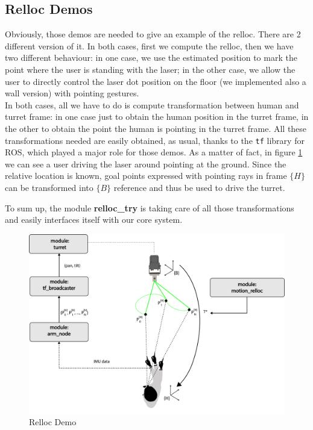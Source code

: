\subsection{Relloc Demos}
Obviously, those demos are needed to give an example of the relloc. There are 2 different version of it. In both cases, first we compute the relloc, then we have two different behaviour: in one case, we use the estimated position to mark the point where the user is standing with the laser; in the other case, we allow the user to directly control the laser dot position on the floor (we implemented also a wall version) with pointing gestures.\\
In both cases, all we have to do is compute transformation between human and turret frame: in one case just to obtain the human position in the turret frame, in the other to obtain the point the human is pointing in the turret frame. All these transformations needed are easily obtained, as usual, thanks to the \texttt{tf} library for ROS, which played a major role for those demos. As a matter of fact, in figure \ref{fig:rellocDemo} we can see a user driving the laser around pointing at the ground. Since the relative location is known, goal points expressed with pointing rays in frame $\{H\}$ can be transformed into $\{B\}$ reference and thus be used to drive the turret.

To sum up, the module \textbf{relloc\_try} is taking care of all those transformations and easily interfaces itself with our core system.
\begin{figure}
	\centering
	\includegraphics[width=\textwidth]{img/rellocDemo2.png}%
	\caption{Relloc Demo}
	\label{fig:rellocDemo}
\end{figure}
